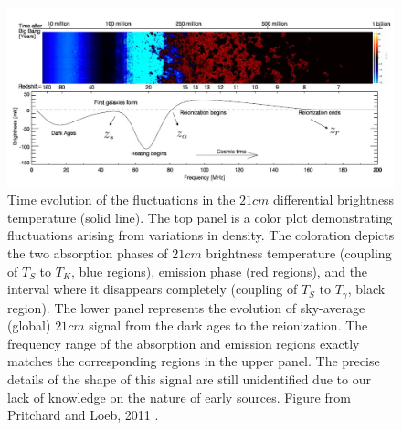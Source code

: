 \documentclass[12pt, TexShade, letterpaper]{report}
\begin{document}
\begin{figure}[h!]
\centering
\includegraphics[scale =0.5]{global_signal_pritchard_loeb.png}
\caption[Time evolution of the fluctuations in the $21cm$ differential brightness temperature]{Time evolution of the fluctuations in the $21cm$ differential brightness temperature (solid line). The top panel is a color plot demonstrating fluctuations arising from variations in density. The coloration depicts the two absorption phases of $21cm$ brightness temperature (coupling of $T_S$ to $T_K$, blue regions), emission phase (red regions), and the interval where it disappears completely (coupling of $T_S$ to $T_\gamma$, black region). The lower panel represents the evolution of sky-average (global) $21cm$ signal from the dark ages to the reionization. The frequency range of the absorption and emission regions exactly matches the corresponding regions in the upper panel. The precise details of the shape of this signal are still unidentified due to our lack of knowledge on the nature of early sources\cite{liu2013global}. Figure from Pritchard and Loeb, 2011 \cite{21century}.}
\label{fig:global_signal_pritchard_loeb}
\end{figure}
\end{document}
